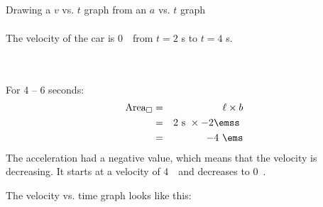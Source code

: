 \begin{wex}{Drawing a $v$ vs. $t$ graph from an $a$ vs. $t$ graph}
{\begin{minipage}{0.3\textwidth}
\begin{eqnarray*}
\end{eqnarray*}
The velocity of the car is 0~\ms ~from $t=2$ s to $t=4$ s.\\
\\
\\
\end{minipage}
\begin{minipage}{0.03\textwidth}
\begin{center}
\end{center}
\end{minipage}
\begin{minipage}{0.3\textwidth}
For 4 -- 6 seconds:
\begin{eqnarray*}
\text{Area}_{\square} &=& \ell \times b\\
&=& 2\text{~s}\ \times -2\emss\ \\
&=&-4\ \ems
\end{eqnarray*}
The acceleration had a negative value, which means that the velocity is decreasing. It starts at a velocity of 4~\ms ~and decreases to 0~\ms.\\
\end{minipage}
\begin{minipage}{0.3\textwidth}
The velocity vs. time graph looks like this:
\end{minipage}
\begin{minipage}{0.7\textwidth}
\begin{center}
\end{center}
\end{minipage}
}
\end{wex}
    \noindent
   \label{m38795*secfhsst!!!underscore!!!id3332}
